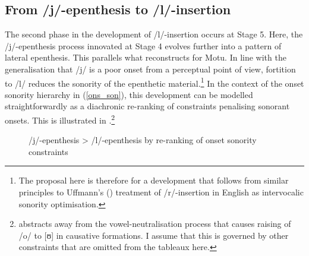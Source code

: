 \documentclass[output=paper,colorlinks,citecolor=brown]{langscibook}
\begin{document}
\subsection{From /j/-epenthesis to /l/-insertion}
\largerpage
The second phase in the development of /l/-insertion occurs at Stage 5.  Here, the /j/-epenthesis process innovated at Stage 4 evolves further into a pattern of lateral epenthesis. This parallels what \citet{Blust1999} reconstructs for Motu. In line with the generalisation that /j/ is a poor onset from a perceptual point of view, fortition to /l/ reduces the sonority of the epenthetic material.\footnote{The proposal here is therefore for a development that follows from similar principles to Uffmann's (\citeyear{Uffman2007b}) treatment of /r/-insertion in English as intervocalic sonority optimisation.}  In the context of the onset sonority hierarchy in (\ref{ons_son}), this development can be modelled straightforwardly as a diachronic re-ranking of constraints penalising sonorant onsets.  This is illustrated in .\footnote{ abstracts away from the vowel-neutralisation process that causes raising of /o/ to [ʊ] in causative formations.  I assume that this is governed by other constraints that are omitted from the tableaux here.}  

\begin{figure}
\caption{/j/-epenthesis > /l/-epenthesis by re-ranking of onset sonority constraints}
\label{jtol}
{}

\end{figure}
\end{document}
